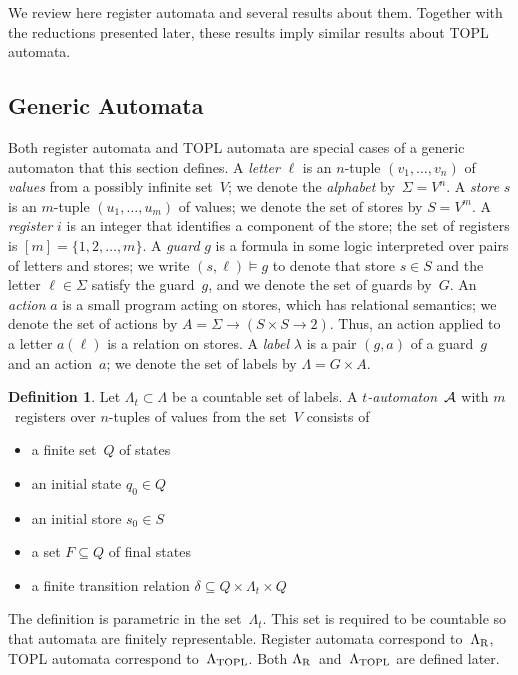 \documentclass{article} %
\theoremstyle{definition}
\newtheorem{definition}{Definition}
\theoremstyle{remark}
\begin{document}
We review here register automata and several results about them.
Together with the reductions presented later, these results imply similar results about TOPL automata.

\subsection{Generic Automata}

Both register automata and TOPL automata are special cases of a generic automaton that this section defines.
A \emph{letter} $\ell$ is an $n$-tuple $(v_1,\ldots,v_n)$ of \emph{values} from a possibly infinite set~$V$;
we denote the \emph{alphabet} by~$\Sigma=V^n$.
A \emph{store} $s$ is an $m$-tuple $(u_1,\ldots,u_m)$ of values;
we denote the set of stores by $S=V^m$.
A \emph{register} $i$ is an integer that identifies a component of the store;
the set of registers is $[m]=\{1,2,\ldots,m\}$.
A \emph{guard} $g$ is a formula in some logic interpreted over pairs of letters and stores;
we write $(s,\ell)\models g$ to denote that store $s\in S$ and the letter $\ell\in\Sigma$ satisfy the guard~$g$, and we denote the set of guards by~$G$.
An \emph{action} $a$ is a small program acting on stores, which has relational semantics;
we denote the set of actions by $A=\Sigma\to(S\times S\to 2)$.
Thus, an action applied to a letter $a(\ell)$ is a relation on stores.
A \emph{label} $\lambda$ is a pair $(g,a)$ of a guard~$g$ and an action~$a$;
we denote the set of labels by $\Lambda=G\times A$.

\begin{definition}\label{def:automaton}
Let $\Lambda_t\subset\Lambda$ be a countable set of labels.
A \emph{$t$-automaton}~${\cal A}$ with $m$~registers over $n$-tuples of values from the set~$V$ consists of
\begin{itemize}
\item a finite set~$Q$ of states
\item an initial state $q_0\in Q$
\item an initial store $s_0\in S$
\item a set $F\subseteq Q$ of final states
\item a finite transition relation $\delta\subseteq Q\times\Lambda_t\times Q$
\end{itemize}
\end{definition}
The definition is parametric in the set~$\Lambda_t$.
This set is required to be countable so that automata are finitely representable.
Register automata correspond to~$\Lambda_{\rm R}$,
TOPL automata correspond to~$\Lambda_{\rm TOPL}$.
Both $\Lambda_{\rm R}$~and~$\Lambda_{\rm TOPL}$ are defined later.
\end{document}
